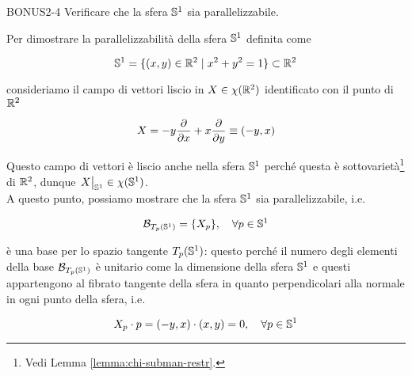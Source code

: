 
{BONUS2-4}
{
Verificare che la sfera $ \S^{1} $ sia parallelizzabile.
}
{
Per dimostrare la parallelizzabilità della sfera $ \S^{1} $ definita come

\begin{equation}
	\S^{1} = \{ (x,y) \in \R^{2} \mid x^{2} + y^{2} = 1 \} \subset \R^{2}
\end{equation}

consideriamo il campo di vettori liscio in $ X \in \chi(\R^{2}) $ identificato con il punto di $ \R^{2} $

\begin{equation}
	X = - y \pdv{x} + x \pdv{y} \equiv (-y,x)
\end{equation}

Questo campo di vettori è liscio anche nella sfera $ \S^{1} $ perché questa è sottovarietà\footnote{%
	Vedi Lemma \ref{lemma:chi-subman-restr}.%
} di $ \R^{2} $, dunque $ \eval{X}_{\S^{1}} \in \chi(\S^{1}) $. \\
A questo punto, possiamo mostrare che la sfera $ \S^{1} $ sia parallelizzabile, i.e.

\begin{equation}
	\B_{T_{p}(\S^{1})} = \{ X_{p} \} \qcomma \forall p \in \S^{1}
\end{equation}

è una base per lo spazio tangente $ T_{p}(\S^{1}) $: questo perché il numero degli elementi della base $ \B_{T_{p}(\S^{1})} $ è unitario come la dimensione della sfera $ \S^{1} $ e questi appartengono al fibrato tangente della sfera in quanto perpendicolari alla normale in ogni punto della sfera, i.e.

\begin{equation}
	X_{p} \cdot p = (-y,x) \cdot (x,y) = 0 \qcomma \forall p \in \S^{1}
\end{equation}
}



